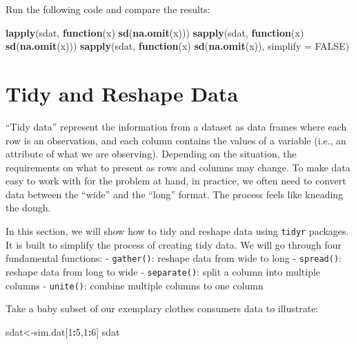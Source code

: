 \documentclass[12pt,]{krantz}
\makeatletter
\newenvironment{Shaded}{\begin{snugshade}}{\end{snugshade}}
\newcommand{\ControlFlowTok}[1]{\textcolor[rgb]{0.27,0.27,0.27}{\textbf{#1}}}
\newcommand{\DataTypeTok}[1]{\textcolor[rgb]{0.27,0.27,0.27}{#1}}
\newcommand{\DecValTok}[1]{\textcolor[rgb]{0.06,0.06,0.06}{#1}}
\newcommand{\KeywordTok}[1]{\textcolor[rgb]{0.27,0.27,0.27}{\textbf{#1}}}
\newcommand{\NormalTok}[1]{#1}
\newcommand{\OperatorTok}[1]{\textcolor[rgb]{0.43,0.43,0.43}{\textbf{#1}}}
\newcommand{\OtherTok}[1]{\textcolor[rgb]{0.37,0.37,0.37}{#1}}
\newenvironment{kframe}{%
\medskip{}
\setlength{\fboxsep}{.8em}
 \def\at@end@of@kframe{}%
 \ifinner\ifhmode%
  \def\at@end@of@kframe{\end{minipage}}%
  \begin{minipage}{\columnwidth}%
 \fi\fi%
 \def\FrameCommand##1{\hskip\@totalleftmargin \hskip-\fboxsep
 \colorbox{shadecolor}{##1}\hskip-\fboxsep
     \hskip-\linewidth \hskip-\@totalleftmargin \hskip\columnwidth}%
 \MakeFramed {\advance\hsize-\width
   \@totalleftmargin\z@ \linewidth\hsize
   \@setminipage}}%
 {\par\unskip\endMakeFramed%
 \at@end@of@kframe}
\renewenvironment{Shaded}{\begin{kframe}}{\end{kframe}}
\makeatother
\begin{document}
Run the following code and compare the results:

\begin{Shaded}
\begin{Highlighting}[]
\KeywordTok{lapply}\NormalTok{(sdat, }\ControlFlowTok{function}\NormalTok{(x) }\KeywordTok{sd}\NormalTok{(}\KeywordTok{na.omit}\NormalTok{(x)))}
\KeywordTok{sapply}\NormalTok{(sdat, }\ControlFlowTok{function}\NormalTok{(x) }\KeywordTok{sd}\NormalTok{(}\KeywordTok{na.omit}\NormalTok{(x)))}
\KeywordTok{sapply}\NormalTok{(sdat, }\ControlFlowTok{function}\NormalTok{(x) }\KeywordTok{sd}\NormalTok{(}\KeywordTok{na.omit}\NormalTok{(x)), }\DataTypeTok{simplify =} \OtherTok{FALSE}\NormalTok{)}
\end{Highlighting}
\end{Shaded}

\hypertarget{tidy-and-reshape-data}{%
\section{Tidy and Reshape Data}\label{tidy-and-reshape-data}}

``Tidy data'' represent the information from a dataset as data frames where each row is an observation, and each column contains the values of a variable (i.e., an attribute of what we are observing). Depending on the situation, the requirements on what to present as rows and columns may change. To make data easy to work with for the problem at hand, in practice, we often need to convert data between the ``wide'' and the ``long'' format. The process feels like kneading the dough.

In this section, we will show how to tidy and reshape data using \texttt{tidyr} packages. It is built to simplify the process of creating tidy data. We will go through four fundamental functions:
- \texttt{gather()}: reshape data from wide to long
- \texttt{spread()}: reshape data from long to wide
- \texttt{separate()}: split a column into multiple columns
- \texttt{unite()}: combine multiple columns to one column

Take a baby subset of our exemplary clothes consumers data to illustrate:

\begin{Shaded}
\begin{Highlighting}[]
\NormalTok{sdat<-sim.dat[}\DecValTok{1}\OperatorTok{:}\DecValTok{5}\NormalTok{,}\DecValTok{1}\OperatorTok{:}\DecValTok{6}\NormalTok{]}
\NormalTok{sdat}
\end{Highlighting}
\end{Shaded}
\end{document}
